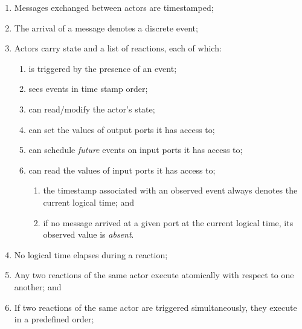 \documentclass[sigconf]{acmart}
\begin{document}






\begin{enumerate}
\item Messages exchanged between actors are timestamped;
\item The arrival of a message denotes a discrete event;
\item Actors carry state and a list of reactions, each of which:
\begin{enumerate}
\item is triggered by the presence of an event;
\item sees events in time stamp order;
\item can read/modify the actor's state;
\item can set the values of output ports it has access to;
\item can schedule \emph{future} events on input ports it has access to;
\item can read the values of input ports it has access to;
\begin{enumerate}
\item the timestamp associated with an observed event always denotes the current logical time; and
\item if no message arrived at a given port at the current logical time, its observed value is \emph{absent}. 
\end{enumerate}
\end{enumerate}
\item No logical time elapses during a reaction;
\item Any two reactions of the same actor execute atomically with respect to one another; and
\item If two reactions of the same actor are triggered simultaneously, they execute in a predefined order;
\end{enumerate}
\end{document}
